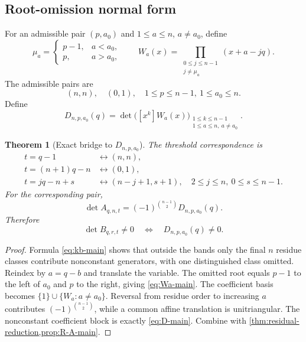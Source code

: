 \documentclass[11pt]{amsart}
\newcommand{\1}{\mathbf 1}
\newtheorem{theorem}{Theorem}[section]
\theoremstyle{remark}
\begin{document}
\subsection{Root-omission normal form}
For an admissible pair $(p,a_0)$ and $1\le a\le n$, $a\ne a_0$, define
\begin{equation}\label{eq:Wa-main}
 \mu_a=\begin{cases}p-1,&a<a_0,\\p,&a>a_0,\end{cases}
 \qquad
 W_a(x)=\prod_{\substack{0\le j\le n-1\\j\ne\mu_a}}(x+a-jq).
\end{equation}
The admissible pairs are
\[
 (n,n),\quad(0,1),\quad 1\le p\le n-1,\ 1\le a_0\le n.
\]
Define
\begin{equation}\label{eq:D-main}
 D_{n,p,a_0}(q)=
 \det\bigl([x^k]W_a(x)\bigr)_{\substack{1\le k\le n-1\\1\le a\le n,\ a\ne a_0}}.
\end{equation}

\begin{theorem}[Exact bridge to $D_{n,p,a_0}$]\label{thm:A-D-main}
The threshold correspondence is
\begin{align*}
 t=q-1&\longleftrightarrow(n,n),\\
 t=(n+1)q-n&\longleftrightarrow(0,1),\\
 t=jq-n+s&\longleftrightarrow(n-j+1,s+1),
 \quad2\le j\le n,\ 0\le s\le n-1.
\end{align*}
For the corresponding pair,
\begin{equation}\label{eq:A-D-main}
 \det A_{q,n,t}=(-1)^{\binom{n-1}{2}}D_{n,p,a_0}(q).
\end{equation}
Therefore
\begin{equation}\label{eq:B-D-main}
 \det B_{q,r,t}\ne0\quad\Longleftrightarrow\quad D_{n,p,a_0}(q)\ne0.
\end{equation}
\end{theorem}

\begin{proof}
Formula \eqref{eq:kb-main} shows that outside the bands only the final $n$ residue classes contribute nonconstant generators, with one distinguished class omitted. Reindex by $a=q-b$ and translate the variable. The omitted root equals $p-1$ to the left of $a_0$ and $p$ to the right, giving \eqref{eq:Wa-main}. The coefficient basis becomes $\{1\}\cup\{W_a:a\ne a_0\}$. Reversal from residue order to increasing $a$ contributes $(-1)^{\binom{n-1}{2}}$, while a common affine translation is unitriangular. The nonconstant coefficient block is exactly \eqref{eq:D-main}. Combine with \cref{thm:residual-reduction,prop:R-A-main}.
\end{proof}
\end{document}
